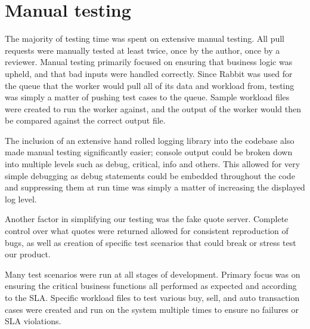 \section{Manual testing}
The majority of testing time was spent on extensive manual testing.
All pull requests were manually tested at least twice, once by the author, once by a reviewer.
Manual testing primarily focused on ensuring that business logic was upheld, and that bad inputs were handled correctly.
Since Rabbit was used for the queue that the worker would pull all of its data and workload from, testing was simply a matter of pushing test cases to the queue.
Sample workload files were created to run the worker against, and the output of the worker would then be compared against the correct output file.

The inclusion of an extensive hand rolled logging library into the codebase also made manual testing significantly easier; console output could be broken down into multiple levels such as debug, critical, info and others.
This allowed for very simple debugging as debug statements could be embedded throughout the code and suppressing them at run time was simply a matter of increasing the displayed log level.

Another factor in simplifying our testing was the fake quote server.
Complete control over what quotes were returned allowed for consistent reproduction of bugs, as well as creation of specific test scenarios that could break or stress test our product.

Many test scenarios were run at all stages of development.
Primary focus was on ensuring the critical business functions all performed as expected and according to the SLA.
Specific workload files to test various buy, sell, and auto transaction cases were created and run on the system multiple times to ensure no failures or SLA violations.
